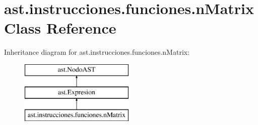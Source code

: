 \hypertarget{classast_1_1instrucciones_1_1funciones_1_1n_matrix}{}\section{ast.\+instrucciones.\+funciones.\+n\+Matrix Class Reference}
\label{classast_1_1instrucciones_1_1funciones_1_1n_matrix}
Inheritance diagram for ast.\+instrucciones.\+funciones.\+n\+Matrix\+:\begin{figure}[H]
\begin{center}
\leavevmode
\includegraphics[height=3.000000cm]{classast_1_1instrucciones_1_1funciones_1_1n_matrix}
\end{center}
\end{figure}
